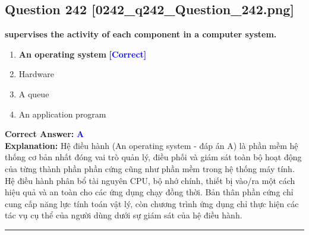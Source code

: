 \documentclass[11pt,a4paper]{article}
\begin{document}
\begin{minipage}{\textwidth}
\subsection*{Question 242 \quad \footnotesize{[0242\_q242\_Question\_242.png]}}
\noindent \textbf{supervises the activity of each component in a computer system.}

\begin{enumerate}[label=\Alph*.]
    \item \textbf{An operating system} \hfill \textcolor{blue}{\textbf{[Correct]}}
    \item Hardware
    \item A queue
    \item An application program
\end{enumerate}

\noindent \textbf{Correct Answer:} \textcolor{blue}{\textbf{A}} \\[2pt]
\noindent \textbf{Explanation:} Hệ điều hành (An operating system - đáp án A) là phần mềm hệ thống cơ bản nhất đóng vai trò quản lý, điều phối và giám sát toàn bộ hoạt động của từng thành phần phần cứng cũng như phần mềm trong hệ thống máy tính. Hệ điều hành phân bổ tài nguyên CPU, bộ nhớ chính, thiết bị vào/ra một cách hiệu quả và an toàn cho các ứng dụng chạy đồng thời. Bản thân phần cứng chỉ cung cấp năng lực tính toán vật lý, còn chương trình ứng dụng chỉ thực hiện các tác vụ cụ thể của người dùng dưới sự giám sát của hệ điều hành.

\par\vspace{0.3cm}
\hrule
\vspace{0.3cm}
\end{minipage}
\end{document}
